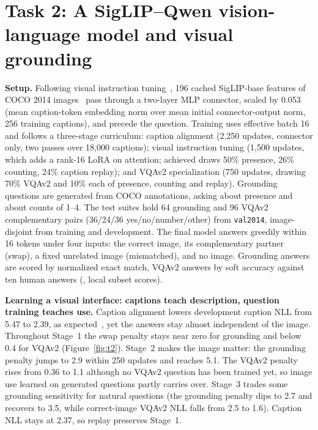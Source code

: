 \documentclass{article}
\begin{document}
\FloatBarrier
\section{Task 2: A SigLIP--Qwen vision-language model and visual grounding}

\textbf{Setup.} Following visual instruction tuning~\cite{liu2023llava}, 196 cached SigLIP-base features of COCO 2014 images~\cite{lin2014coco} pass through a two-layer MLP connector, scaled by 0.053 (mean caption-token embedding norm over mean initial connector-output norm, 256 training captions), and precede the question. Training uses effective batch 16 and follows a three-stage curriculum: caption alignment (2,250 updates, connector only, two passes over 18,000 captions); visual instruction tuning (1,500 updates, which adds a rank-16 LoRA on attention; achieved draws 50\% presence, 26\% counting, 24\% caption replay); and VQAv2 specialization (750 updates, drawing 70\% VQAv2 and 10\% each of presence, counting and replay). Grounding questions are generated from COCO annotations, asking about presence and about counts of 1--4. The test suites hold 64 grounding and 96 VQAv2 complementary pairs (36/24/36 yes/no/number/other) from \texttt{val2014}, image-disjoint from training and development. The final model answers greedily within 16 tokens under four inputs: the correct image, its complementary partner (swap), a fixed unrelated image (mismatched), and no image. Grounding answers are scored by normalized exact match, VQAv2 answers by soft accuracy against ten human answers (\cite{antol2015vqa}, local subset scores).

\textbf{Learning a visual interface: captions teach description, question training teaches use.} Caption alignment lowers development caption NLL from 5.47 to 2.39, as expected~\cite{liu2023llava}, yet the answers stay almost independent of the image. Throughout Stage~1 the swap penalty stays near zero for grounding and below 0.4 for VQAv2 (Figure~\ref{fig:t2}). Stage~2 makes the image matter: the grounding penalty jumps to 2.9 within 250 updates and reaches 5.1. The VQAv2 penalty rises from 0.36 to 1.1 although no VQAv2 question has been trained yet, so image use learned on generated questions partly carries over. Stage~3 trades some grounding sensitivity for natural questions (the grounding penalty dips to 2.7 and recovers to 3.5, while correct-image VQAv2 NLL falls from 2.5 to 1.6). Caption NLL stays at 2.37, so replay preserves Stage~1.
\end{document}

